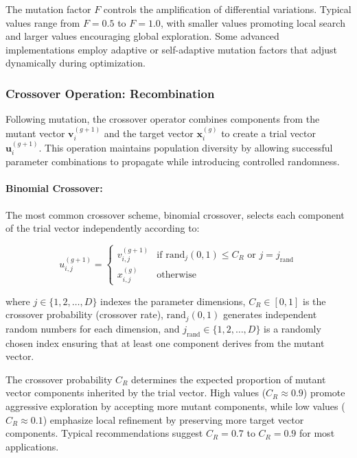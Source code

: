 \documentclass[12pt,a4paper]{report}
\begin{document}
The mutation factor $F$ controls the amplification of differential variations. Typical values range from $F = 0.5$ to $F = 1.0$, with smaller values promoting local search and larger values encouraging global exploration. Some advanced implementations employ adaptive or self-adaptive mutation factors that adjust dynamically during optimization.

\subsubsection{Crossover Operation: Recombination}

Following mutation, the crossover operator combines components from the mutant vector $\mathbf{v}_i^{(g+1)}$ and the target vector $\mathbf{x}_i^{(g)}$ to create a trial vector $\mathbf{u}_i^{(g+1)}$. This operation maintains population diversity by allowing successful parameter combinations to propagate while introducing controlled randomness.

\paragraph{Binomial Crossover:}

The most common crossover scheme, binomial crossover, selects each component of the trial vector independently according to:

\begin{equation}
u_{i,j}^{(g+1)} = \begin{cases}
v_{i,j}^{(g+1)} & \text{if } \text{rand}_j(0,1) \leq C_R \text{ or } j = j_{\text{rand}} \\
x_{i,j}^{(g)} & \text{otherwise}
\end{cases}
\label{eq:binomial_crossover}
\end{equation}

where $j \in \{1, 2, \ldots, D\}$ indexes the parameter dimensions, $C_R \in [0,1]$ is the crossover probability (crossover rate), $\text{rand}_j(0,1)$ generates independent random numbers for each dimension, and $j_{\text{rand}} \in \{1, 2, \ldots, D\}$ is a randomly chosen index ensuring that at least one component derives from the mutant vector.

The crossover probability $C_R$ determines the expected proportion of mutant vector components inherited by the trial vector. High values ($C_R \approx 0.9$) promote aggressive exploration by accepting more mutant components, while low values ($C_R \approx 0.1$) emphasize local refinement by preserving more target vector components. Typical recommendations suggest $C_R = 0.7$ to $C_R = 0.9$ for most applications.
\end{document}
